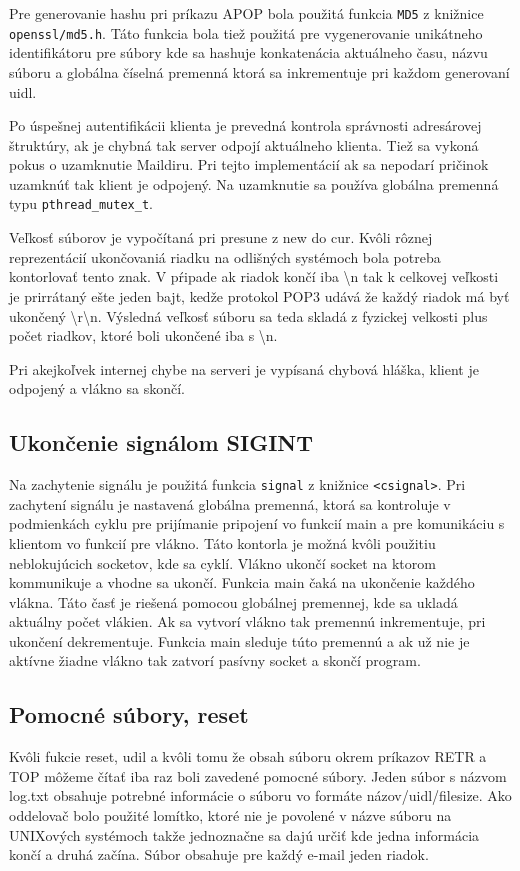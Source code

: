 \documentclass[11pt,a4paper]{article}
\begin{document}
Pre generovanie hashu pri príkazu APOP bola použitá funkcia \texttt{MD5} z knižnice \texttt{openssl/md5.h}. Táto funkcia bola tiež použitá pre vygenerovanie unikátneho identifikátoru pre súbory kde sa hashuje konkatenácia aktuálneho času, názvu súboru a globálna číselná premenná ktorá sa inkrementuje pri každom generovaní uidl.

Po úspešnej autentifikácii klienta je prevedná kontrola správnosti adresárovej štruktúry, ak je chybná tak server odpojí aktuálneho klienta. Tiež sa vykoná pokus o uzamknutie Maildiru. Pri tejto implementácií ak sa nepodarí pričinok uzamknúť tak klient je odpojený. Na uzamknutie sa používa globálna premenná typu \texttt{pthread\_mutex\_t}.    

Veľkosť súborov je vypočítaná pri presune z new do cur. Kvôli rôznej reprezentácií ukončovaniá riadku na odlišných systémoch bola potreba kontorlovať tento znak. V pŕipade ak riadok končí iba \textbackslash n tak k celkovej veľkosti je prirrátaný ešte jeden bajt, kedže protokol POP3 udává že každý riadok má byť ukončený \textbackslash r\textbackslash n. Výsledná veľkosť súboru sa teda skladá z fyzickej velkosti plus počet riadkov, ktoré boli ukončené iba s \textbackslash n.


Pri akejkoľvek internej chybe na serveri je vypísaná chybová hláška, klient je odpojený a vlákno sa skončí. 

\subsection{Ukončenie signálom SIGINT}
Na zachytenie signálu je použitá funkcia \texttt{signal} z knižnice \texttt{<csignal>}. Pri zachytení signálu je nastavená globálna premenná, ktorá sa kontroluje v podmienkách 
cyklu pre prijímanie pripojení vo funkcií main a pre komunikáciu s klientom vo funkcií pre vlákno. Táto kontorla je možná kvôli použitiu neblokujúcich socketov, kde sa cyklí. Vlákno ukončí socket na ktorom kommunikuje a vhodne sa ukončí. Funkcia main čaká na ukončenie každého vlákna. Táto časť je riešená pomocou globálnej premennej, kde sa ukladá aktuálny počet vlákien. Ak sa vytvorí vlákno tak premennú inkrementuje, pri ukončení dekrementuje. Funkcia main sleduje túto premennú a ak už nie je aktívne žiadne vlákno tak zatvorí pasívny socket a skončí program.

\subsection{Pomocné súbory, reset}
Kvôli fukcie reset, udil a kvôli tomu že obsah súboru okrem príkazov RETR a TOP môžeme čítať iba raz boli zavedené pomocné súbory. Jeden súbor s názvom log.txt obsahuje potrebné informácie o súboru vo formáte názov/uidl/filesize. Ako oddelovač bolo použité lomítko, ktoré nie je povolené v názve súboru na UNIXových systémoch takže jednoznačne sa dajú určiť kde jedna informácia končí a druhá začína. Súbor obsahuje pre každý e-mail jeden riadok. 
\end{document}
